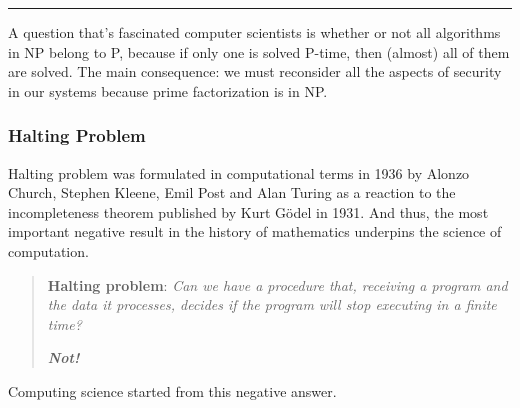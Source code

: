 \noindent\rule{16cm}{0.8pt}


A question that’s fascinated  computer scientists is whether or not all algorithms in NP belong to P, because if only one is solved P-time, then (almost) all of them are solved. The main consequence: we must reconsider all the aspects of security in our systems because prime factorization is in NP.

\subsubsection{Halting Problem}

Halting problem was formulated in computational terms in 1936 by Alonzo Church, Stephen Kleene, Emil Post and Alan Turing as a reaction to the incompleteness theorem published by Kurt G\" odel in 1931. And thus, the most important negative result in the history of mathematics underpins the science of computation.

\begin{quote}
{\bf Halting problem}: {\em Can we have a procedure that, receiving a program and the data it processes, decides if the program will stop executing in a finite time?}

{\bf {\em Not!}}
\end{quote}

Computing science started from this negative answer.


